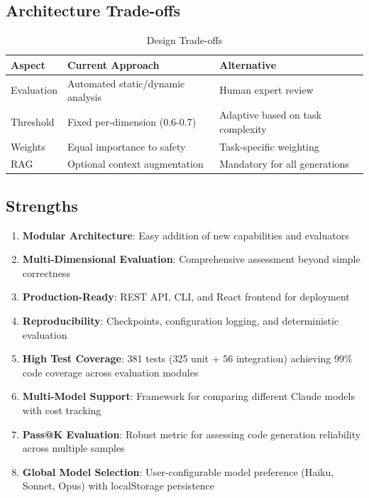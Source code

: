 \documentclass[12pt,a4paper]{article}
\begin{document}
\subsection{Architecture Trade-offs}

\begin{table}[H]
\centering
\caption{Design Trade-offs}
\begin{tabular}{lp{5cm}p{5cm}}
\toprule
\textbf{Aspect} & \textbf{Current Approach} & \textbf{Alternative} \\
\midrule
Evaluation & Automated static/dynamic analysis & Human expert review \\
Threshold & Fixed per-dimension (0.6-0.7) & Adaptive based on task complexity \\
Weights & Equal importance to safety & Task-specific weighting \\
RAG & Optional context augmentation & Mandatory for all generations \\
\bottomrule
\end{tabular}
\label{tab:tradeoffs}
\end{table}

\subsection{Strengths}

\begin{enumerate}
    \item \textbf{Modular Architecture}: Easy addition of new capabilities and evaluators
    \item \textbf{Multi-Dimensional Evaluation}: Comprehensive assessment beyond simple correctness
    \item \textbf{Production-Ready}: REST API, CLI, and React frontend for deployment
    \item \textbf{Reproducibility}: Checkpoints, configuration logging, and deterministic evaluation
    \item \textbf{High Test Coverage}: 381 tests (325 unit + 56 integration) achieving 99\% code coverage across evaluation modules
    \item \textbf{Multi-Model Support}: Framework for comparing different Claude models with cost tracking
    \item \textbf{Pass@K Evaluation}: Robust metric for assessing code generation reliability across multiple samples
    \item \textbf{Global Model Selection}: User-configurable model preference (Haiku, Sonnet, Opus) with localStorage persistence
\end{enumerate}
\end{document}
